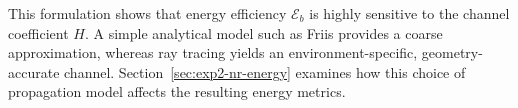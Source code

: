 This formulation shows that energy efficiency $\mathcal{E}_b$ is highly sensitive to the channel coefficient $H$.
A simple analytical model such as Friis provides a coarse approximation, whereas ray tracing yields an environment-specific, geometry-accurate channel.
Section~\ref{sec:exp2-nr-energy} examines how this choice of propagation model affects the resulting energy metrics.
